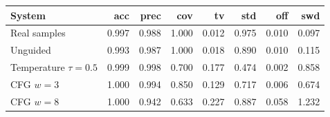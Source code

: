 \begin{tabular}{lrrrrrrr}\toprule System & acc & prec & cov & tv & std & off & swd \\\midrule
Real samples & 0.997 & 0.988 & 1.000 & 0.012 & 0.975 & 0.010 & 0.097 \\
Unguided & 0.993 & 0.987 & 1.000 & 0.018 & 0.890 & 0.010 & 0.115 \\
Temperature $\tau=0.5$ & 0.999 & 0.998 & 0.700 & 0.177 & 0.474 & 0.002 & 0.858 \\
CFG $w=3$ & 1.000 & 0.994 & 0.850 & 0.129 & 0.717 & 0.006 & 0.674 \\
CFG $w=8$ & 1.000 & 0.942 & 0.633 & 0.227 & 0.887 & 0.058 & 1.232 \\
\bottomrule\end{tabular}
